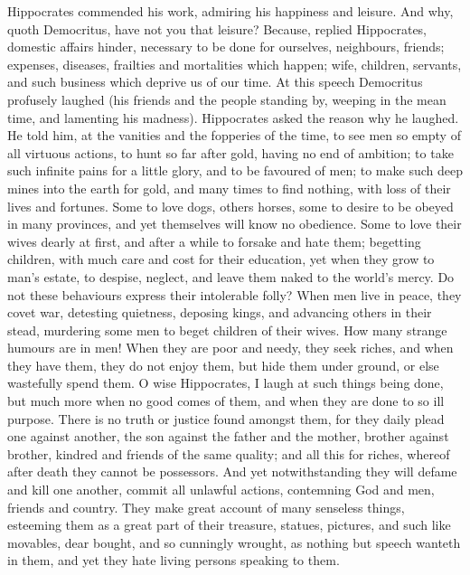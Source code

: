 {Hippocrates commended his work, admiring his happiness and leisure. And
why, quoth Democritus, have not you that leisure? Because, replied
Hippocrates, domestic affairs hinder, necessary to be done for
ourselves, neighbours, friends; expenses, diseases, frailties and
mortalities which happen; wife, children, servants, and such business
which deprive us of our time. At this speech Democritus profusely
laughed (his friends and the people standing by, weeping in the mean
time, and lamenting his madness). Hippocrates asked the reason why he
laughed. He told him, at the vanities and the fopperies of the time, to
see men so empty of all virtuous actions, to hunt so far after gold,
having no end of ambition; to take such infinite pains for a little
glory, and to be favoured of men; to make such deep mines into the
earth for gold, and many times to find nothing, with loss of their
lives and fortunes. Some to love dogs, others horses, some to desire to
be obeyed in many provinces, and yet themselves will know no
obedience. Some to love their wives dearly at first, and after a
while to forsake and hate them; begetting children, with much care and
cost for their education, yet when they grow to man's estate, to
despise, neglect, and leave them naked to the world's mercy. Do
not these behaviours express their intolerable folly? When men live in
peace, they covet war, detesting quietness,  deposing kings, and
advancing others in their stead, murdering some men to beget children
of their wives. How many strange humours are in men! When they are poor
and needy, they seek riches, and when they have them, they do not enjoy
them, but hide them under ground, or else wastefully spend them. O wise
Hippocrates, I laugh at such things being done, but much more when no
good comes of them, and when they are done to so ill purpose. There is
no truth or justice found amongst them, for they daily plead one
against another, the son against the father and the mother,
brother against brother, kindred and friends of the same quality; and
all this for riches, whereof after death they cannot be possessors. And
yet notwithstanding they will defame and kill one another, commit all
unlawful actions, contemning God and men, friends and country. They
make great account of many senseless things, esteeming them as a great
part of their treasure, statues, pictures, and such like movables, dear
bought, and so cunningly wrought, as nothing but speech wanteth in
them, and yet they hate living persons speaking to them.

}
